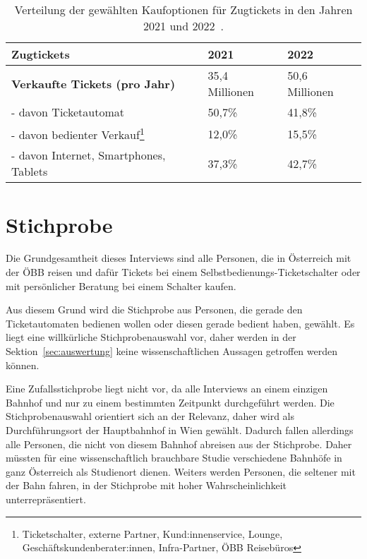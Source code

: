 \documentclass[]{article}
\begin{document}
\begin{table}
\begin{minipage}{\textwidth}
	\label{tab:zugtickets_aufteilung}
	\centering
	\begin{tabular}{|l|l|l|}
		\hline
		\textbf{Zugtickets} & \textbf{2021} & \textbf{2022} \\
		\hline
		\textbf{Verkaufte Tickets (pro Jahr)} & 35,4 Millionen & 50,6 Millionen \\
		\hline
		- davon Ticketautomat & 50,7\% & 41,8\% \\
		\hline
		- davon bedienter Verkauf\footnote{Ticketschalter, externe Partner, Kund:innenservice, Lounge, Geschäftskundenberater:innen, Infra-Partner, ÖBB Reisebüros} & 12,0\% & 15,5\% \\
		\hline
		- davon Internet, Smartphones, Tablets & 37,3\% & 42,7\% \\
		\hline
	\end{tabular}
\end{minipage}
	\caption{Verteilung der gewählten Kaufoptionen für Zugtickets in den Jahren 2021 und 2022~\cite{oebb_zahlendatenfakten202223}.}
\end{table}


\section{Stichprobe}
Die Grundgesamtheit dieses Interviews sind alle Personen, die in Österreich mit der ÖBB reisen und dafür Tickets bei einem Selbstbedienungs-Ticketschalter oder mit persönlicher Beratung bei einem Schalter kaufen.

Aus diesem Grund wird die Stichprobe aus Personen, die gerade den Ticketautomaten bedienen wollen oder diesen gerade bedient haben, gewählt. Es liegt eine willkürliche Stichprobenauswahl vor, daher werden in der Sektion~\ref{sec:auswertung} keine wissenschaftlichen Aussagen getroffen werden können.

Eine Zufallsstichprobe liegt nicht vor, da alle Interviews an einem einzigen Bahnhof und nur zu einem bestimmten Zeitpunkt durchgeführt werden. Die Stichprobenauswahl orientiert sich an der Relevanz, daher wird als Durchführungsort der Hauptbahnhof in Wien gewählt. Dadurch fallen allerdings alle Personen, die nicht von diesem Bahnhof abreisen aus der Stichprobe. Daher müssten für eine wissenschaftlich brauchbare Studie verschiedene Bahnhöfe in ganz Österreich als Studienort dienen. Weiters werden Personen, die seltener mit der Bahn fahren, in der Stichprobe mit hoher Wahrscheinlichkeit unterrepräsentiert.
\end{document}
